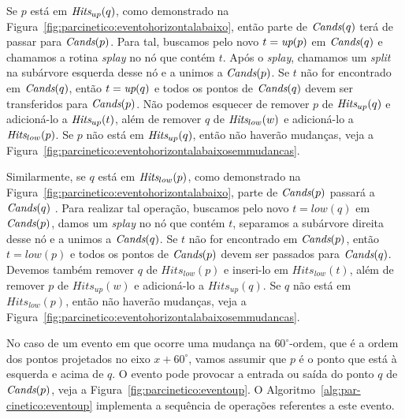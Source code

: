

Se $p$ está em $\textit{Hits}_{up}(q)$, como demonstrado na
Figura~\ref{fig:parcinetico:eventohorizontalabaixo}, então parte de $\textit{Cands}(q)$ terá de passar
para $\textit{Cands}(p)$.
Para tal, buscamos pelo novo $t = \textit{up}(p)$ em $\textit{Cands}(q)$ e chamamos a rotina \textit{splay} no
nó que contém $t$.
Após o \textit{splay}, chamamos um \textit{split} na subárvore esquerda desse nó e a unimos a
$\textit{Cands}(p)$.
Se $t$ não for encontrado em $\textit{Cands}(q)$, então $t = \textit{up}(q)$ e todos os pontos de $\textit{Cands}(q)$
devem ser transferidos para $\textit{Cands}(p)$.
Não podemos esquecer de remover $p$ de $\textit{Hits}_{up}(q)$ e adicioná-lo a $\textit{Hits}_{up}(t)$, além de
remover $q$ de $\textit{Hits}_{low}(w)$ e adicioná-lo a $\textit{Hits}_{low}(p)$.
Se $p$ não está em $\textit{Hits}_{up}(q)$, então não haverão mudanças, veja a
Figura~\ref{fig:parcinetico:eventohorizontalabaixosemmudancas}.



Similarmente, se $q$ está em $\textit{Hits}_{low}(p)$, como demonstrado na
Figura~\ref{fig:parcinetico:eventohorizontalabaixo}, parte de $\textit{Cands}(p)$ passará a $\textit{Cands}(q)$
.
Para realizar tal operação, buscamos pelo novo $t = low(q)$ em $\textit{Cands}(p)$, damos um \textit{splay}
no nó que contém $t$, separamos a subárvore direita desse nó e a unimos a $\textit{Cands}(q)$.
Se $t$ não for encontrado em $\textit{Cands}(p)$, então $t = low(p)$ e todos os pontos de $\textit{Cands}(p)$ devem
ser passados para $\textit{Cands}(q)$.
Devemos também remover $q$ de $Hits_{low}(p)$ e inseri-lo em $Hits_{low}(t)$, além de remover $p$
de $Hits_{up}(w)$ e adicioná-lo a $Hits_{up}(q)$.
Se $q$ não está em $Hits_{low}(p)$, então não haverão mudanças, veja a
Figura~\ref{fig:parcinetico:eventohorizontalabaixosemmudancas}.



No caso de um evento em que ocorre uma mudança na $60^\circ$-ordem, que é a ordem dos pontos
projetados no eixo $x + 60^\circ$, vamos assumir que $p$ é o ponto que está à esquerda e acima de $q$.
O evento pode provocar a entrada ou saída do ponto $q$ de $\textit{Cands}(p)$, veja a
Figura~\ref{fig:parcinetico:eventoup}.
O Algoritmo~\ref{alg:par-cinetico:eventoup} implementa a sequência de operações referentes a este
evento.

